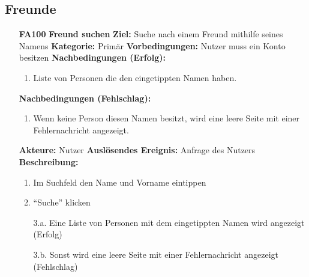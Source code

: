 \documentclass[parskip=full]{scrartcl}
\begin{document}
		\subsection{Freunde} \label{sec:FAFreunde}
		\begin{itemize}[nosep]
			\item[\textbf{FA100}]\textbf{Freund suchen}
			\newline\newline \textbf{Ziel:} Suche nach einem Freund mithilfe seines Namens
			\newline \textbf{Kategorie:} Primär
			\newline \textbf{Vorbedingungen:} Nutzer muss ein Konto besitzen
			\newline \textbf{Nachbedingungen (Erfolg):} 
			\begin{enumerate}[nosep]
				\item Liste von Personen die den eingetippten Namen haben.
			\end{enumerate}
			\textbf{Nachbedingungen (Fehlschlag):} 
			\begin{enumerate}[nosep]
				\item Wenn keine Person diesen Namen besitzt, wird eine leere Seite mit einer Fehlernachricht angezeigt.
			\end{enumerate}  
			\textbf{Akteure:} Nutzer
			\newline \textbf{Auslösendes Ereignis:} Anfrage des Nutzers
			\newline \textbf{Beschreibung:}
			\begin{enumerate}[nosep]
				\item Im Suchfeld den Name und Vorname eintippen
				\item “Suche” klicken
				\item[3.a.] Eine Liste von Personen mit dem eingetippten Namen wird angezeigt (Erfolg)
				\item[3.b.] Sonst wird eine leere Seite mit einer Fehlernachricht angezeigt (Fehlschlag) \\
			\end{enumerate}
			

\end{itemize}
\end{document}
